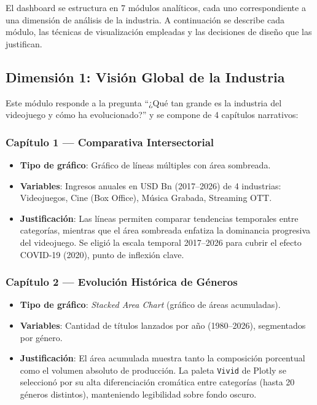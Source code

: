 \documentclass[11pt,a4paper]{article}
\begin{document}
El dashboard se estructura en 7 módulos analíticos, cada uno correspondiente a una dimensión de análisis de la industria. A continuación se describe cada módulo, las técnicas de visualización empleadas y las decisiones de diseño que las justifican.

\subsection{Dimensión 1: Visión Global de la Industria}

Este módulo responde a la pregunta ``¿Qué tan grande es la industria del videojuego y cómo ha evolucionado?'' y se compone de 4 capítulos narrativos:

\subsubsection{Capítulo 1 — Comparativa Intersectorial}
\begin{itemize}
  \item \textbf{Tipo de gráfico}: Gráfico de líneas múltiples con área sombreada.
  \item \textbf{Variables}: Ingresos anuales en USD Bn (2017--2026) de 4 industrias: Videojuegos, Cine (Box Office), Música Grabada, Streaming OTT.
  \item \textbf{Justificación}: Las líneas permiten comparar tendencias temporales entre categorías, mientras que el área sombreada enfatiza la dominancia progresiva del videojuego. Se eligió la escala temporal 2017--2026 para cubrir el efecto COVID-19 (2020), punto de inflexión clave.
\end{itemize}

\subsubsection{Capítulo 2 — Evolución Histórica de Géneros}
\begin{itemize}
  \item \textbf{Tipo de gráfico}: \textit{Stacked Area Chart} (gráfico de áreas acumuladas).
  \item \textbf{Variables}: Cantidad de títulos lanzados por año (1980--2026), segmentados por género.
  \item \textbf{Justificación}: El área acumulada muestra tanto la composición porcentual como el volumen absoluto de producción. La paleta \texttt{Vivid} de Plotly se seleccionó por su alta diferenciación cromática entre categorías (hasta 20 géneros distintos), manteniendo legibilidad sobre fondo oscuro.
\end{itemize}
\end{document}
